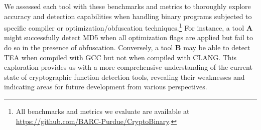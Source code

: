 We assessed each tool with these benchmarks and metrics to thoroughly explore accuracy and detection capabilities when handling binary programs subjected to specific compiler or optimization/obfuscation techniques.\footnote{All benchmarks and metrics we evaluate are available at \url{https://github.com/BARC-Purdue/CryptoBinary}.} For instance, a tool \textbf{A} might successfully detect MD5 when all optimization flags are applied but fail to do so in the presence of obfuscation. Conversely, a tool \textbf{B} may be able to detect TEA when compiled with GCC but not when compiled with CLANG. This exploration provides us with a more comprehensive understanding of the current state of cryptographic function detection tools, revealing their weaknesses and indicating areas for future development from various perspectives.














